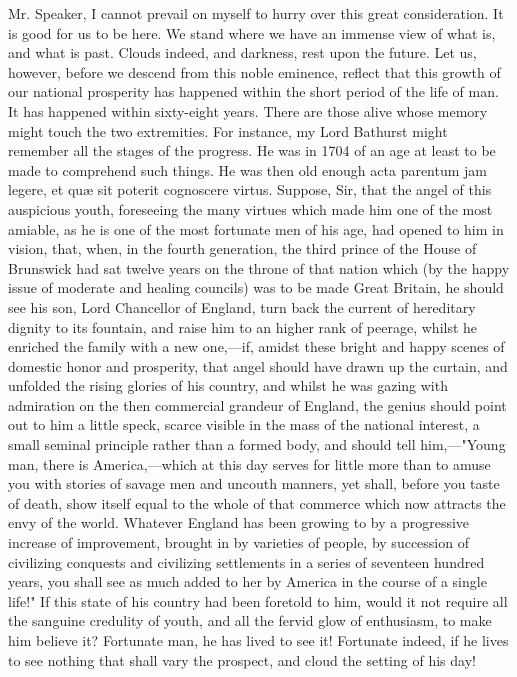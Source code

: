 Mr. Speaker, I cannot prevail on myself to hurry over this great consideration. It is good for us to be here. We stand where we have an immense view of what is, and what is past. Clouds indeed, and darkness, rest upon the future. Let us, however, before we descend from this noble eminence, reflect that this growth of our national prosperity has happened within the short period of the life of man. It has happened within sixty-eight years. There are those alive whose memory might touch the two extremities. For instance, my Lord Bathurst might remember all the stages of the progress. He was in 1704 of an age at least to be made to comprehend such things. He was then old enough acta parentum jam legere, et quæ sit poterit cognoscere virtus. Suppose, Sir, that the angel of this auspicious youth, foreseeing the many virtues which made him one of the most amiable, as he is one of the most fortunate men of his age, had opened to him in vision, that, when, in the fourth generation, the third prince of the House of Brunswick had sat twelve years on the throne of that nation which (by the happy issue of moderate and healing councils) was to be made Great Britain, he should see his son, Lord Chancellor of England, turn back the current of hereditary dignity to its fountain, and raise him to an higher rank of peerage, whilst he enriched the family with a new one,—if, amidst these bright and happy scenes of domestic honor and prosperity, that angel should have drawn up the curtain, and unfolded the rising glories of his country, and whilst he was gazing with admiration on the then commercial grandeur of England, the genius should point out to him a little speck, scarce visible in the mass of the national interest, a small seminal principle rather than a formed body, and should tell him,—"Young man, there is America,—which at this day serves for little more than to amuse you with stories of savage men and uncouth manners, yet shall, before you taste of death, show itself equal to the whole of that commerce which now attracts the envy of the world. Whatever England has been growing to by a progressive increase of improvement, brought in by varieties of people, by succession of civilizing conquests and civilizing settlements in a series of seventeen hundred years, you shall see as much added to her by America in the course of a single life!" If this state of his country had been foretold to him, would it not require all the sanguine credulity of youth, and all the fervid glow of enthusiasm, to make him believe it? Fortunate man, he has lived to see it! Fortunate indeed, if he lives to see nothing that shall vary the prospect, and cloud the setting of his day!

